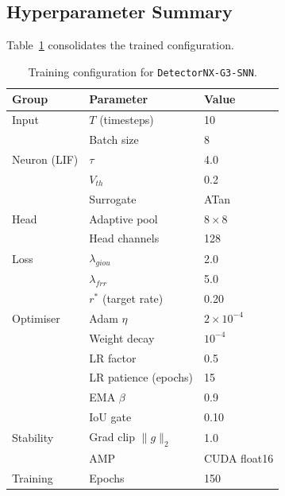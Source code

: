 \subsection{Hyperparameter Summary}
\label{subsec:training_hyperparameters}

Table~\ref{tab:model_hyperparameters} consolidates the trained configuration.

\begin{table}[H]
\centering
\caption[Training configuration for \texttt{DetectorNX-G3-SNN}.]{Training configuration for \texttt{DetectorNX-G3-SNN}.}
\label{tab:model_hyperparameters}
\small
\begin{tabular}{|l|l|l|}
\hline
\textbf{Group} & \textbf{Parameter} & \textbf{Value} \\
\hline
Input         & $T$ (timesteps)          & 10 \\
              & Batch size               & 8 \\
\hline
Neuron (LIF)  & $\tau$                   & 4.0 \\
              & $V_{th}$                 & 0.2 \\
              & Surrogate                & ATan \\
\hline
Head          & Adaptive pool            & $8 \times 8$ \\
              & Head channels            & 128 \\
\hline
Loss          & $\lambda_{giou}$         & 2.0 \\
              & $\lambda_{frr}$          & 5.0 \\
              & $r^*$ (target rate)      & 0.20 \\
\hline
Optimiser     & Adam $\eta$              & $2 \times 10^{-4}$ \\
              & Weight decay             & $10^{-4}$ \\
              & LR factor                & 0.5 \\
              & LR patience (epochs)     & 15 \\
              & EMA $\beta$              & 0.9 \\
              & IoU gate                 & 0.10 \\
\hline
Stability     & Grad clip $\|g\|_2$      & 1.0 \\
              & AMP                      & CUDA float16 \\
\hline
Training      & Epochs                   & 150 \\
\hline
\end{tabular}
\end{table}
